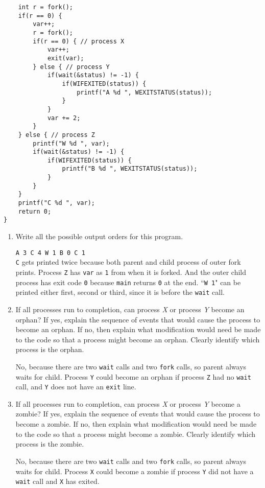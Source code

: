 \documentclass[11pt]{article}
\newcommand{\myspace}{\vspace{0.4cm}}
\begin{document}
\begin{enumerate}
\begin{Verbatim}
	int r = fork();
	if(r == 0) {
		var++;
		r = fork();
		if(r == 0) { // process X
			var++;
			exit(var);
		} else { // process Y
			if(wait(&status) != -1) {
				if(WIFEXITED(status)) {
					printf("A %d ", WEXITSTATUS(status));
				}
			}
			var += 2;
		}
	} else { // process Z
		printf("W %d ", var);
		if(wait(&status) != -1) {
			if(WIFEXITED(status)) {
				printf("B %d ", WEXITSTATUS(status));
			}
		}
	}
	printf("C %d ", var);
	return 0;
}
		\end{Verbatim}
		\begin{enumerate}
			\item Write all the possible output orders for this program.
				\begin{tcolorbox}\Verb|A 3 C 4 W 1 B 0 C 1|\\
					\Verb|C| gets printed twice because both parent and child process of outer fork prints. Process \Verb|Z| has \Verb|var| as \Verb|1| from when it is forked. And the outer child process has exit code \Verb|0| because \Verb|main| returns \Verb|0| at the end. ``\Verb|W 1|" can be printed either first, second or third, since it is before the \Verb|wait| call.
				\end{tcolorbox}
			\myspace
			\item If all processes run to completion, can process \textit{X} or process \textit{Y} become an orphan? If yes, explain the sequence of events that would cause the process to become an orphan. If no, then explain what modification would need be made to the code so that a process might become an orphan. Clearly identify which process is the orphan.
				\begin{tcolorbox}No, because there are two \Verb|wait| calls and two \Verb|fork| calls, so parent always waits for child. Process \Verb|Y| could become an orphan if process \Verb|Z| had no \Verb|wait| call, and \Verb|Y| does not have an \Verb|exit| line.\end{tcolorbox}

			\newpage
			\item
			If all processes run to completion, can process \textit{X} or process \textit{Y} become a zombie? If yes, explain the sequence of events that would cause the process to become a zombie. If no, then explain what modification would need be made to the code so that a process might become a zombie. Clearly identify which process is the zombie.
				\begin{tcolorbox}No, because there are two \Verb|wait| calls and two \Verb|fork| calls, so parent always waits for child. Process \Verb|X| could become a zombie if process \Verb|Y| did not have a \Verb|wait| call and \Verb|X| has exited.\end{tcolorbox}
		\end{enumerate}


\end{enumerate}
\end{document}
